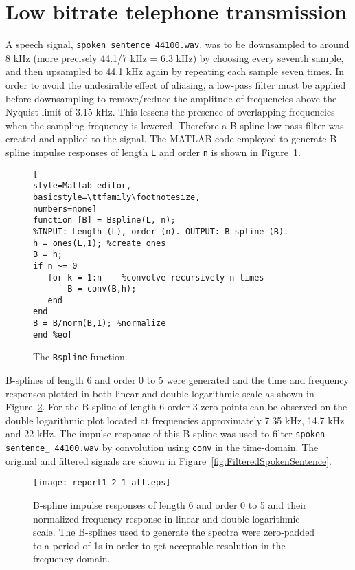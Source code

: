 \section{ Low bitrate telephone transmission}
A speech signal, \texttt{spoken\_sentence\_44100.wav}, was to be downsampled to around 8 kHz (more precisely 44.1/7 kHz = 6.3 kHz) by choosing every seventh sample, and then upsampled to 44.1 kHz again by repeating each sample seven times. In order to avoid the undesirable effect of aliasing, a low-pass filter must be applied before downsampling to remove/reduce the amplitude of frequencies above the Nyquist limit of 3.15 kHz. This lessens the presence of overlapping frequencies when the sampling frequency is lowered. Therefore a B-spline low-pass filter was created and applied to the signal. The MATLAB code employed to generate B-spline impulse responses of length \texttt{L} and order \texttt{n} is shown in Figure~\ref{fig:B-splineCode}.\\

\begin{figure}[H]
\center
\begin{lstlisting}[
style=Matlab-editor,
basicstyle=\ttfamily\footnotesize,
numbers=none]
function [B] = Bspline(L, n); 
%INPUT: Length (L), order (n). OUTPUT: B-spline (B).
h = ones(L,1); %create ones
B = h;
if n ~= 0 
   for k = 1:n    %convolve recursively n times
       B = conv(B,h);
   end
end
B = B/norm(B,1); %normalize
end %eof
\end{lstlisting}
\caption{The \texttt{Bspline} function.}
\label{fig:B-splineCode}
\end{figure}

B-splines of length 6 and order 0 to 5 were generated and the time and frequency responses plotted in both linear and double logarithmic scale as shown in Figure~\ref{fig:B-splinePlot}. For the B-spline of length 6 order 3 zero-points can be observed on the double logarithmic plot located at frequencies approximately 7.35 kHz, 14.7 kHz and 22 kHz. The impulse response of this B-spline was used to filter \texttt{spoken\_ sentence\_ 44100.wav} by convolution using \texttt{conv} in the time-domain. The original and filtered signals are shown in Figure~\ref{fig:FilteredSpokenSentence}.\\

\begin{figure}[H]
\center
\texttt{[image: report1-2-1-alt.eps]}%
\caption{B-spline impulse responses of length 6 and order 0 to 5 and their normalized frequency response in linear and double logarithmic scale. The B-splines used to generate the spectra were zero-padded to a period of 1s in order to get acceptable resolution in the frequency domain.}
\label{fig:B-splinePlot}
\end{figure}


